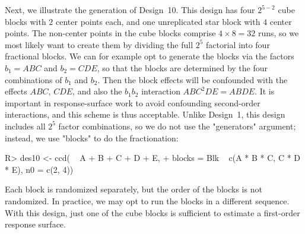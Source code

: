 \documentclass[article,nojss]{jss}
\begin{document}
Next, we illustrate the generation of Design~10.
This design has four $2^{5-2}$ cube blocks with $2$ center points each, and one unreplicated star block with $4$ center points.  The non-center points in the cube blocks comprise $4\times8=32$ runs, so we most likely want to create them by dividing the full $2^5$ factorial into four fractional blocks.  We can for example opt to generate the blocks via the factors $b_1=ABC$ and $b_2=CDE$, so that the blocks are determined by the four combinations of $b_1$ and $b_2$.  Then the block effects will be confounded with the effects $ABC$, $CDE$, and also the $b_1b_2$ interaction $ABC^2DE=ABDE$.  It  is important in response-surface work to avoid confounding second-order interactions, and this scheme is thus acceptable.  Unlike Design~1, this design includes all $2^5$ factor combinations, so we do not use the "generators" argument; instead, we use "blocks" to do the fractionation:
\begin{Schunk}
\begin{Sinput}
R> des10 <- ccd( ~ A + B + C + D + E,
+   blocks = Blk ~ c(A * B * C, C * D * E), n0 = c(2, 4))
\end{Sinput}
\end{Schunk}
Each block is randomized separately, but the order of the blocks is not randomized. In practice, we may opt to run the blocks in a different sequence.  
With this design, just one of the cube blocks is sufficient to estimate a first-order response surface.
\end{document}
